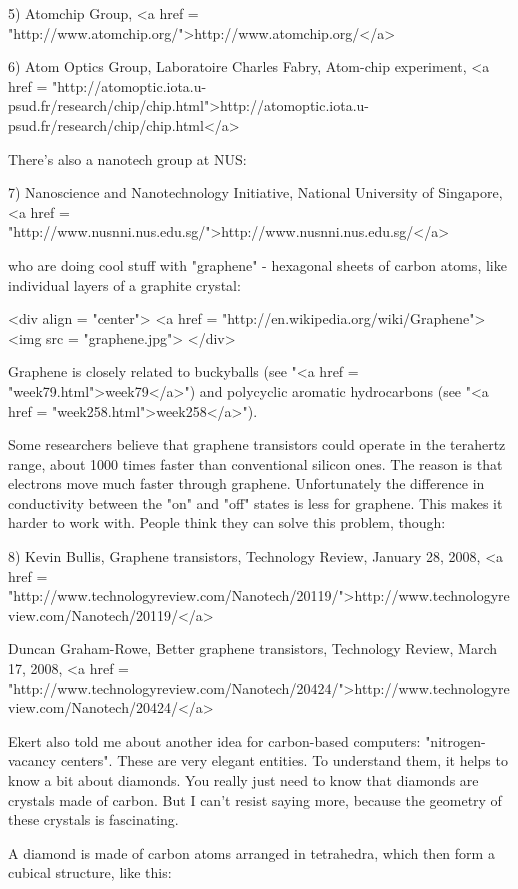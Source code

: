 5) Atomchip Group, <a href =
"http://www.atomchip.org/">http://www.atomchip.org/</a>

6) Atom Optics Group, Laboratoire Charles Fabry, Atom-chip experiment,
<a href =
"http://atomoptic.iota.u-psud.fr/research/chip/chip.html">http://atomoptic.iota.u-psud.fr/research/chip/chip.html</a>

There's also a nanotech group at NUS:

7) Nanoscience and Nanotechnology Initiative, National 
University of Singapore, <a href = "http://www.nusnni.nus.edu.sg/">http://www.nusnni.nus.edu.sg/</a>

who are doing cool stuff with "graphene" - 
hexagonal sheets of carbon atoms, like individual
layers of a graphite crystal:

<div align = "center">
<a href = "http://en.wikipedia.org/wiki/Graphene">
<img src = "graphene.jpg">
</div>

Graphene is closely related to buckyballs (see "<a href =
"week79.html">week79</a>") and polycyclic aromatic hydrocarbons (see
"<a href = "week258.html">week258</a>").

Some researchers believe that graphene
transistors could operate in the terahertz range, about 1000 times
faster than conventional silicon ones.  The reason is that electrons
move much faster through graphene.  Unfortunately the difference in
conductivity between the "on" and "off" states is
less for graphene.  This makes it harder to work with.  People think
they can solve this problem, though:

8) Kevin Bullis, Graphene transistors, Technology Review,
January 28, 2008, <a href = "http://www.technologyreview.com/Nanotech/20119/">http://www.technologyreview.com/Nanotech/20119/</a>

Duncan Graham-Rowe, Better graphene transistors, Technology
Review, March 17, 2008, <a href = "http://www.technologyreview.com/Nanotech/20424/">http://www.technologyreview.com/Nanotech/20424/</a>

Ekert also told me about another idea for carbon-based computers:
"nitrogen-vacancy centers".  These are very elegant
entities.  To understand them, it helps to know a bit about diamonds.
You really just need to know that diamonds are crystals made of
carbon.  But I can't resist saying more, because the geometry of these
crystals is fascinating.

A diamond is made of carbon atoms arranged in tetrahedra, which 
then form a cubical structure, like this:

